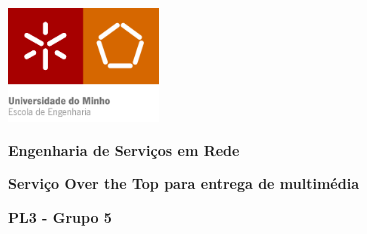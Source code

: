 \documentclass[a4paper, 11pt]{article}
\begin{document}
\begin{titlepage}
    \begin{center}

    	\includegraphics[width=0.3\textwidth]{images/Capa/EEUMfinal .png}
       
       \vspace*{1cm}
       
       \textbf{\Large Engenharia de Serviços em Rede}
        \vspace{1cm}
        \par
        \textbf{\Large Serviço Over the Top para entrega de multimédia}
        \vspace{1cm}
        \par
        \Large \textbf{PL3 - Grupo 5}
        

\end{center}
\end{titlepage}
\end{document}
